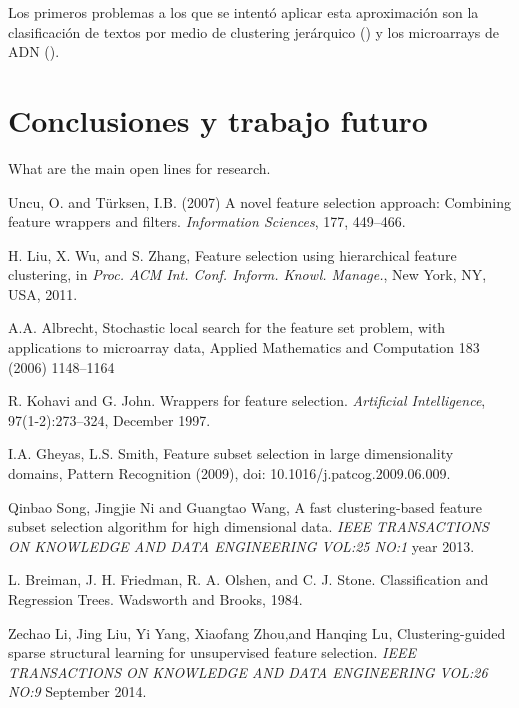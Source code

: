 \documentclass[a4paper,11pt]{article}
\begin{document}
Los primeros problemas a los que se intentó aplicar esta aproximación son la clasificación de textos por medio de clustering jerárquico (\cite{dhillon2003}) y los microarrays de ADN (\cite{yu2004}). 

\section{Conclusiones y trabajo futuro}

What are the main open lines for research.




\begin{thebibliography}{}

Uncu, O. and T\"urksen, I.B. (2007) A novel feature selection
approach: Combining feature wrappers and filters. \textit{Information Sciences}, 177, 449--466.

H. Liu, X. Wu, and S. Zhang, Feature selection using hierarchical feature clustering, in \textit{Proc. ACM Int. Conf. Inform. Knowl. Manage.}, New York, NY, USA, 2011.

A.A. Albrecht, Stochastic local search for the feature set problem, with applications to microarray data, Applied Mathematics and Computation 183 (2006) 1148–1164

R. Kohavi and G. John. Wrappers for feature selection. \textit{Artificial Intelligence}, 97(1-2):273–324,
December 1997.

I.A. Gheyas, L.S. Smith, Feature subset selection in large dimensionality domains, Pattern Recognition (2009), doi:
10.1016/j.patcog.2009.06.009.

Qinbao Song, Jingjie Ni and Guangtao Wang, A fast clustering-based feature subset selection algorithm for high dimensional data. \textit{IEEE TRANSACTIONS ON KNOWLEDGE AND DATA ENGINEERING VOL:25 NO:1} year 2013.

L. Breiman, J. H. Friedman, R. A. Olshen, and C. J. Stone. Classification and Regression Trees. Wadsworth and Brooks, 1984.

Zechao Li, Jing Liu, Yi Yang, Xiaofang Zhou,and Hanqing Lu, Clustering-guided sparse structural learning
for unsupervised feature selection. \textit{IEEE TRANSACTIONS ON KNOWLEDGE AND DATA ENGINEERING VOL:26 NO:9} September 2014.


\end{thebibliography}
\end{document}
